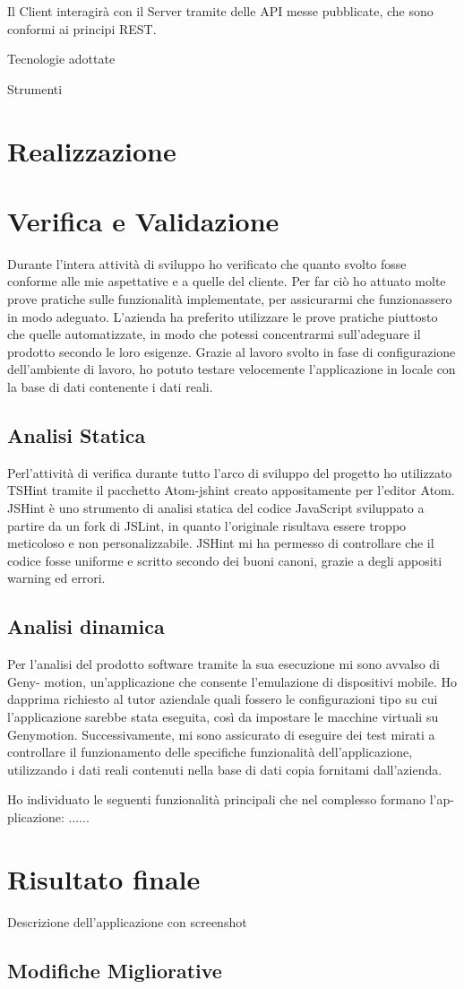 	Il Client interagirà con il Server tramite delle API messe pubblicate, che sono
	conformi ai principi REST.
	
	Tecnologie adottate
	
	Strumenti

\section{Realizzazione}

\section{Verifica e Validazione} %
	Durante l’intera attività di sviluppo ho verificato che quanto svolto fosse conforme alle
	mie aspettative e a quelle del cliente. Per far ciò ho attuato molte prove pratiche sulle
	funzionalità implementate, per assicurarmi che funzionassero in modo adeguato.
	L’azienda ha preferito utilizzare le prove pratiche piuttosto che quelle automatizzate,
	in modo che potessi concentrarmi sull’adeguare il prodotto secondo le loro esigenze.
	Grazie al lavoro svolto in fase di configurazione dell’ambiente di lavoro, ho potuto
	testare velocemente l’applicazione in locale con la base di dati contenente i dati reali.
	
	\subsection{Analisi Statica} 
	Perl’attività di verifica durante tutto l’arco di sviluppo del progetto ho utilizzato TSHint
	tramite il pacchetto Atom-jshint creato appositamente per l’editor Atom. JSHint è uno
	strumento di analisi statica del codice JavaScript sviluppato a partire da un fork di
	JSLint, in quanto l’originale risultava essere troppo meticoloso e non personalizzabile.
	JSHint mi ha permesso di controllare che il codice fosse uniforme e scritto secondo dei
	buoni canoni, grazie a degli appositi warning ed errori.
	
	\subsection{Analisi dinamica}
	Per l’analisi del prodotto software tramite la sua esecuzione mi sono avvalso di Geny-
	motion, un’applicazione che consente l’emulazione di dispositivi mobile. Ho dapprima
	richiesto al tutor aziendale quali fossero le configurazioni tipo su cui l’applicazione
	sarebbe stata eseguita, così da impostare le macchine virtuali su Genymotion. Successivamente, mi sono assicurato di eseguire dei test mirati a controllare il funzionamento
	delle specifiche funzionalità dell’applicazione, utilizzando i dati reali contenuti nella
	base di dati copia fornitami dall’azienda.
	
	Ho individuato le seguenti funzionalità principali che nel complesso formano l’ap-
	plicazione:
	......

\section{Risultato finale}
	Descrizione dell'applicazione con screenshot
	\subsection{Modifiche Migliorative}
